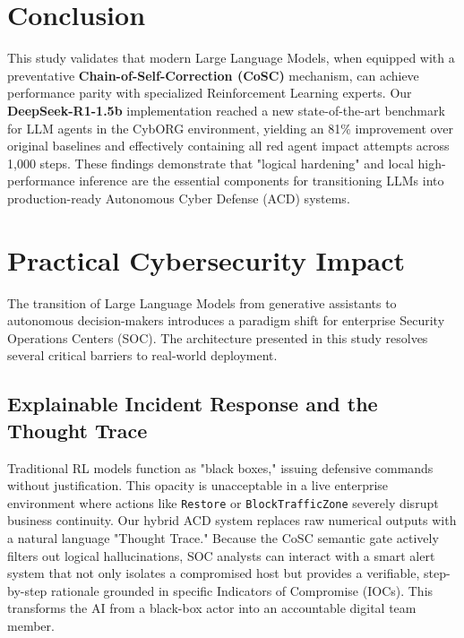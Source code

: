 \documentclass[letterpaper, 10 pt, conference]{ieeeconf}
\begin{document}
\section{Conclusion}
This study validates that modern Large Language Models, when equipped with a preventative \textbf{Chain-of-Self-Correction (CoSC)} mechanism, can achieve performance parity with specialized Reinforcement Learning experts. Our \textbf{DeepSeek-R1-1.5b} implementation reached a new state-of-the-art benchmark for LLM agents in the CybORG environment, yielding an 81\% improvement over original baselines and effectively containing all red agent impact attempts across 1,000 steps. These findings demonstrate that "logical hardening" and local high-performance inference are the essential components for transitioning LLMs into production-ready Autonomous Cyber Defense (ACD) systems.


\section{Practical Cybersecurity Impact}
The transition of Large Language Models from generative assistants to autonomous decision-makers introduces a paradigm shift for enterprise Security Operations Centers (SOC). The architecture presented in this study resolves several critical barriers to real-world deployment.

\subsection{Explainable Incident Response and the Thought Trace}
Traditional RL models function as "black boxes," issuing defensive commands without justification. This opacity is unacceptable in a live enterprise environment where actions like \texttt{Restore} or \texttt{BlockTrafficZone} severely disrupt business continuity. Our hybrid ACD system replaces raw numerical outputs with a natural language "Thought Trace." Because the CoSC semantic gate actively filters out logical hallucinations, SOC analysts can interact with a smart alert system that not only isolates a compromised host but provides a verifiable, step-by-step rationale grounded in specific Indicators of Compromise (IOCs). This transforms the AI from a black-box actor into an accountable digital team member.
\end{document}
